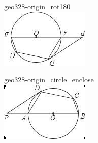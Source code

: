 \documentclass[12pt]{article}
\begin{document}
\begin{center}
\begin{minipage}{0.32\textwidth}
\end{minipage}
\par\medskip
\begin{minipage}{0.32\textwidth}\centering
geo328-origin\_rot180\\
\includegraphics[width=0.95\linewidth]{out_rommath_origin/items/geo328-origin/assets/figure_rot180.png}
\end{minipage}
\hfill\begin{minipage}{0.32\textwidth}\centering
geo328-origin\_circle\_enclose\\
\includegraphics[width=0.95\linewidth]{out_rommath_origin/items/geo328-origin/assets/figure_circle.png}
\end{minipage}
\par
\end{center}
\bigskip
\end{document}
